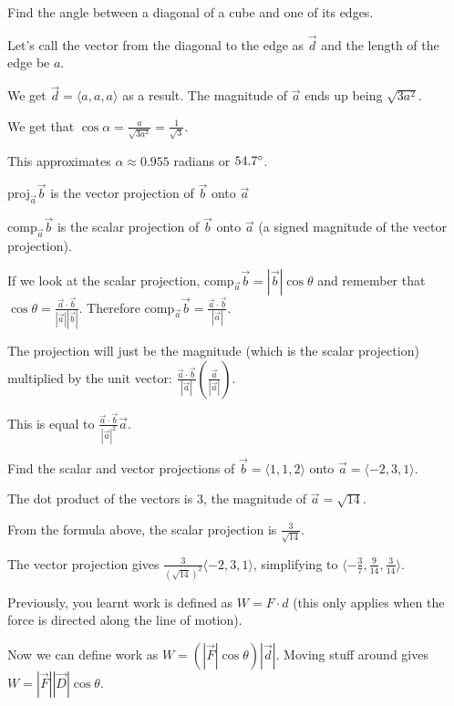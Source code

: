 \documentclass[../calc3.tex]{subfiles}
\begin{document}
\begin{example}
    Find the angle between a diagonal of a cube and one of its edges.

    Let's call the vector from the diagonal to the edge as $\vec{d}$ and the length of the edge be $a$.

    We get $\vec{d}=\langle a,a,a\rangle$ as a result. The magnitude of $\vec{a}$ ends up being $\sqrt{3a^2}$.

    We get that $\cos\alpha = \frac{a}{\sqrt{3a^2}}=\frac{1}{\sqrt{3}}$.

    This approximates $\alpha \approx 0.955$ radians or $54.7\degree$.
\end{example}

proj$_{\vec{a}}\vec{b}$ is the vector projection of $\vec{b}$ onto $\vec{a}$

comp$_{\vec{a}}\vec{b}$ is the scalar projection of $\vec{b}$ onto $\vec{a}$ (a signed magnitude of the vector projection).

If we look at the scalar projection, comp$_{\vec{a}}\vec{b}=|\vec{b}|\cos\theta$ and remember that $\cos\theta = \frac{\vec{a}\cdot\vec{b}}{|\vec{a}||\vec{b}|}$.
Therefore comp$_{\vec{a}}\vec{b}=\frac{\vec{a}\cdot \vec{b}}{|\vec{a}|}$.

The projection will just be the magnitude (which is the scalar projection) multiplied by the unit vector: $\frac{\vec{a}\cdot \vec{b}}{|\vec{a}|}\left(\frac{\vec{a}}{|\vec{a}|}\right)$.

This is equal to $\frac{\vec{a}\cdot \vec{b}}{|\vec{a}|^2}\vec{a}$.

\begin{example}
    Find the scalar and vector projections of $\vec{b}=\langle 1,1,2\rangle$ onto $\vec{a} = \langle -2,3,1\rangle$.

    The dot product of the vectors is $3$, the magnitude of $\vec{a}=\sqrt{14}$.

    From the formula above, the scalar projection is $\frac{3}{\sqrt{14}}$.

    The vector projection gives $\frac{3}{(\sqrt{14})^2}\langle -2,3,1\rangle$, simplifying to $\langle -\frac{3}{7},\frac{9}{14},\frac{3}{14} \rangle$.
\end{example}

Previously, you learnt work is defined as $W=F\cdot d$ (this only applies when the force is directed along the line of motion).

Now we can define work as $W=(|\vec{F}|\cos\theta)|\vec{d}|$. Moving stuff around gives $W=|\vec{F}||\vec{D}|\cos\theta$.
\end{document}
